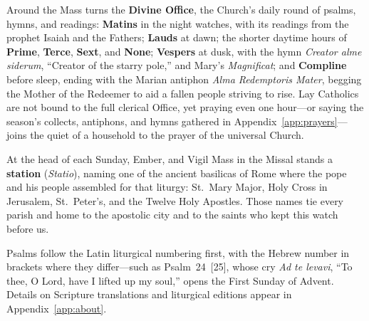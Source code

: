 Around the Mass turns the \textbf{Divine Office}, the Church's daily round
of psalms, hymns, and readings: \textbf{Matins} in the night watches, with
its readings from the prophet Isaiah and the Fathers; \textbf{Lauds} at
dawn; the shorter daytime hours of \textbf{Prime}, \textbf{Terce},
\textbf{Sext}, and \textbf{None}; \textbf{Vespers} at dusk, with the hymn
\textit{Creator alme siderum}, ``Creator of the starry pole,'' and Mary's
\textit{Magnificat}; and \textbf{Compline} before sleep, ending with the
Marian antiphon \textit{Alma Redemptoris Mater}, begging the Mother of the
Redeemer to aid a fallen people striving to rise. Lay Catholics are not
bound to the full clerical Office, yet praying even one hour---or saying
the season's collects, antiphons, and hymns gathered in
Appendix~\ref{app:prayers}---joins the quiet of a household to the prayer
of the universal Church.

At the head of each Sunday, Ember, and Vigil Mass in the Missal stands a
\textbf{station} (\textit{Statio}), naming one of the ancient basilicas of
Rome where the pope and his people assembled for that liturgy: St.~Mary
Major, Holy Cross in Jerusalem, St.~Peter's, and the Twelve Holy Apostles.
Those names tie every parish and home to the apostolic city and to the
saints who kept this watch before us.

Psalms follow the Latin liturgical numbering first, with the Hebrew number
in brackets where they differ---such as Psalm~24~[25], whose cry \textit{Ad
te levavi}, ``To thee, O Lord, have I lifted up my soul,'' opens the First
Sunday of Advent. Details on Scripture translations and liturgical editions
appear in Appendix~\ref{app:about}.
